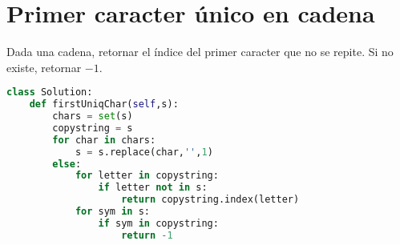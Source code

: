 \documentclass{article}
\begin{document}
\newpage
\section*{Primer caracter único en cadena}
Dada una cadena, retornar el índice del primer caracter que no se repite. Si no existe, retornar $-1$. \\

\begin{lstlisting}[language=Python]
class Solution:
    def firstUniqChar(self,s):
        chars = set(s)
        copystring = s
        for char in chars:
            s = s.replace(char,'',1)
        else:
            for letter in copystring:
                if letter not in s:
                    return copystring.index(letter)
            for sym in s:
                if sym in copystring:
                    return -1
\end{lstlisting}
\vspace{0.5cm}
\end{document}

